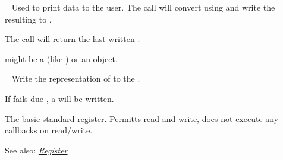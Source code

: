 \documentclass[letterpaper,10pt,english]{sphinxmanual}
\begin{document}
\begin{fulllineitems}
\label{core:py_register_machine2.core.register.OutputRegister}~\label{core:outputregister}
Used to print data to the user.
The  call will convert  using  and write
the resulting  to .

The  call will return the last written .

 might be a  (like ) or an  object.

\begin{fulllineitems}
\label{core:py_register_machine2.core.register.OutputRegister.write}~\label{core:sowrite}
Write the  representation of  to the .

If  fails due , a  will be written.

\end{fulllineitems}


\end{fulllineitems}


\begin{fulllineitems}
\label{core:py_register_machine2.core.register.Register}
The basic standard register. 
Permitts read and write, does not execute any callbacks on read/write.

See also: {\hyperref[core:register]{\emph{Register}}}

\end{fulllineitems}

\end{document}
